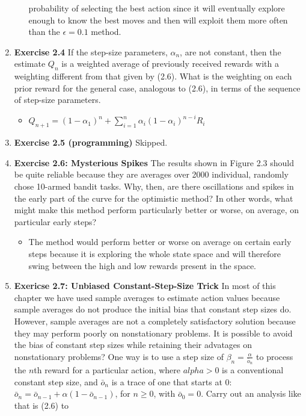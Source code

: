 \documentclass[12pt]{article}
\begin{document}
\begin{enumerate}[label=(\alph*)]
\begin{itemize}
    probability of selecting the best action since it will eventually explore enough to know the best moves and then will
    exploit them more often than the $\epsilon = 0.1$ method. 
  \end{itemize}
  \item \textbf{Exercise 2.4} If the step-size parameters, $\alpha_n$, are not constant, then the estimate $Q_n$ is a
  weighted average of previously received rewards with a weighting different from that given by (2.6). What is the
  weighting on each prior reward for the general case, analogous to (2.6), in terms of the sequence of step-size parameters.
  \begin{itemize}
    \item $Q_{n+1} = (1 - \alpha_1)^n + \sum_{i = 1}^{n}\alpha_i(1 - \alpha_i)^{n - i}R_i$
  \end{itemize}
  \item \textbf{Exercise 2.5 (programming)} Skipped.
  \item \textbf{Exercise 2.6: Mysterious Spikes} The results shown in Figure 2.3 should be quite reliable because they are
  averages over 2000 individual, randomly chose 10-armed bandit tasks. Why, then, are there oscillations and spikes in the early
  part of the curve for the optimistic method? In other words, what might make this method perform particularly better or worse,
  on average, on particular early steps?
  \begin{itemize}
    \item The method would perform better or worse on average on certain early steps because it is exploring the whole state space
    and will therefore swing between the high and low rewards present in the space.
  \end{itemize}
  \item \textbf{Exericse 2.7: Unbiased Constant-Step-Size Trick} In most of this chapter we have used sample averages to estimate action
  values because sample averages do not produce the initial bias that constant step sizes do. However, sample averages are not a completely
  satisfactory solution because they may perform poorly on nonstationary problems. It is possible to avoid the bias of constant step sizes
  while retaining their advatages on nonstationary problems? One way is to use a step size of $\beta_n = \frac{\alpha}{\bar{o}_n}$ to process 
  the $n$th reward for a particular action, where $alpha > 0$ is a conventional constant step size, and $\bar{o}_n$ is a trace of one that starts
  at 0: $\bar{o}_n = \bar{o}_{n-1} + \alpha(1 - \bar{o}_{n-1})$, for $n \ge 0$, with $\bar{o}_0 = 0$. Carry out an analysis like that is (2.6) to

\end{enumerate}
\end{document}
